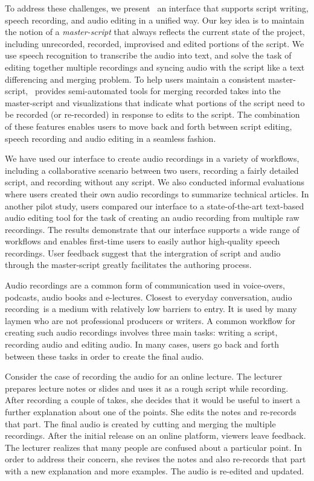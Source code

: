 To address these challenges, we present \systemname\, an interface that supports script writing, speech recording, and audio editing in a unified way. Our key idea is to maintain the notion of a \emph{master-script} that always reflects the current state of the project, including unrecorded, recorded, improvised and edited portions of the script. We  use speech recognition to transcribe the audio into text, and solve the task of editing together multiple recordings and syncing audio with the script like a text differencing and merging problem. To help users maintain a consistent master-script, \systemname\ provides semi-automated tools for merging recorded takes into the master-script and visualizations that indicate what portions of the script need to be recorded (or re-recorded) in response to edits to the script. The combination of these features enables users to move back and forth between script editing, speech recording and audio editing in a seamless fashion.

We have used our interface to create audio recordings in a variety of workflows, including a collaborative scenario between two users, recording a fairly detailed script, and recording without any script. We also conducted informal evaluations where users created their own audio recordings to summarize technical articles.   In another pilot study, users compared our interface to a state-of-the-art text-based audio editing tool for the task of creating an audio recording from multiple raw recordings. The results demonstrate that our interface supports a wide range of workflows and enables first-time users to  easily author high-quality speech recordings. User feedback suggest that the intergration of script and audio through the master-script greatly facilitates the authoring process. 

Audio recordings are a common form of communication used in voice-overs, podcasts, audio books and e-lectures. Closest to everyday conversation, audio recording\ is a medium with relatively low barriers to entry. It is used by many laymen who are not professional producers or writers. A common workflow for creating such audio recordings involves three main tasks: writing a script, recording audio and editing audio. In many cases, users go back and forth between these tasks in order to create the final audio. 

Consider the case of recording the audio for an online lecture. The lecturer prepares lecture notes or slides and uses it as a rough script while recording. After recording a couple of takes, she decides that it would be useful to insert a further explanation about one of the points. She edits the notes and re-records that part. The final audio is created by cutting and merging the multiple recordings. After the initial release on an online platform, viewers leave feedback. The lecturer realizes that many people are confused about a particular point. In order to address their concern, she revises the notes and also  re-records that part with a new explanation and more examples. The audio is re-edited and updated. 


